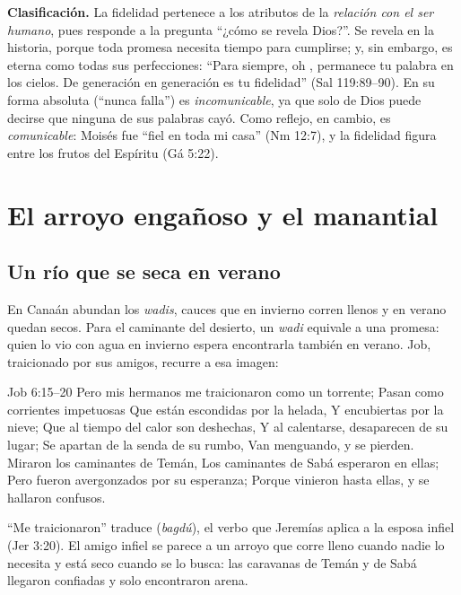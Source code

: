 \textbf{Clasificación.} La fidelidad pertenece a los atributos de la \emph{relación con el ser humano}, pues responde a la pregunta ``¿cómo se revela Dios?''. Se revela en la historia, porque toda promesa necesita tiempo para cumplirse; y, sin embargo, es eterna como todas sus perfecciones: ``Para siempre, oh \SENOR, permanece tu palabra en los cielos. De generación en generación es tu fidelidad'' (Sal 119:89--90). En su forma absoluta (``nunca falla'') es \emph{incomunicable}, ya que solo de Dios puede decirse que ninguna de sus palabras cayó. Como reflejo, en cambio, es \emph{comunicable}: Moisés fue ``fiel en toda mi casa'' (Nm 12:7), y la fidelidad figura entre los frutos del Espíritu (Gá 5:22).


\section{El arroyo engañoso y el manantial}\label{sec:arroyo-fiel}

\subsection{Un río que se seca en verano}
En Canaán abundan los \emph{wadis}, cauces que en invierno corren llenos y en verano quedan secos. Para el caminante del desierto, un \emph{wadi} equivale a una promesa: quien lo vio con agua en invierno espera encontrarla también en verano. Job, traicionado por sus amigos, recurre a esa imagen:

\begin{verso}{Job 6:15–20}
Pero mis hermanos me traicionaron como un torrente; Pasan como corrientes impetuosas Que están escondidas por la helada, Y encubiertas por la nieve; Que al tiempo del calor son deshechas, Y al calentarse, desaparecen de su lugar; Se apartan de la senda de su rumbo, Van menguando, y se pierden. Miraron los caminantes de Temán, Los caminantes de Sabá esperaron en ellas; Pero fueron avergonzados por su esperanza; Porque vinieron hasta ellas, y se hallaron confusos.
\end{verso}

``Me traicionaron'' traduce  (\emph{bagdú}), el verbo que Jeremías aplica a la esposa infiel (Jer 3:20). El amigo infiel se parece a un arroyo que corre lleno cuando nadie lo necesita y está seco cuando se lo busca: las caravanas de Temán y de Sabá llegaron confiadas y solo encontraron arena.

